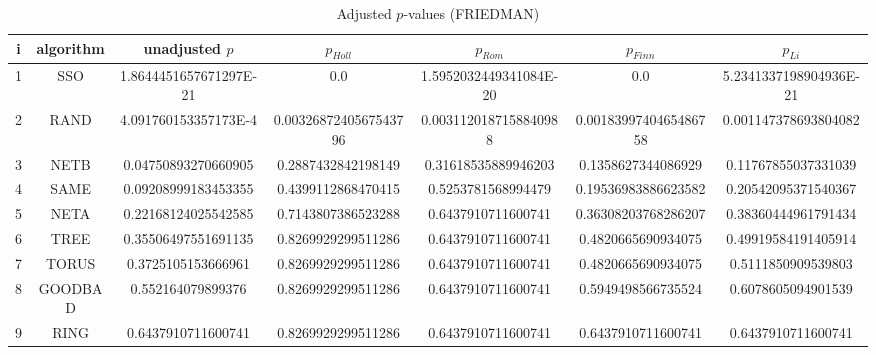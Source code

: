 \documentclass[a4paper,10pt]{article}
\begin{document}
\begin{landscape}
\begin{table}[!htp]
\centering\scriptsize
\caption{Adjusted $p$-values (FRIEDMAN)}
\begin{tabular}{ccccccc}
i&algorithm&unadjusted $p$&$p_{Holl}$&$p_{Rom}$&$p_{Finn}$&$p_{Li}$\\
\hline
1& SSO&1.8644451657671297E-21&0.0&1.5952032449341084E-20&0.0&5.2341337198904936E-21\\
2& RAND&4.091760153357173E-4&0.0032687240567543796&0.0031120187158840988&0.0018399740465486758&0.001147378693804082\\
3& NETB&0.04750893270660905&0.2887432842198149&0.31618535889946203&0.1358627344086929&0.11767855037331039\\
4& SAME&0.09208999183453355&0.4399112868470415&0.5253781568994479&0.19536983886623582&0.20542095371540367\\
5& NETA&0.22168124025542585&0.7143807386523288&0.6437910711600741&0.36308203768286207&0.38360444961791434\\
6& TREE&0.35506497551691135&0.8269929299511286&0.6437910711600741&0.4820665690934075&0.49919584191405914\\
7& TORUS&0.3725105153666961&0.8269929299511286&0.6437910711600741&0.4820665690934075&0.5111850909539803\\
8& GOODBAD&0.552164079899376&0.8269929299511286&0.6437910711600741&0.5949498566735524&0.6078605094901539\\
9& RING&0.6437910711600741&0.8269929299511286&0.6437910711600741&0.6437910711600741&0.6437910711600741\\
\hline
\end{tabular}
\end{table}


\newpage


\end{landscape}
\end{document}
